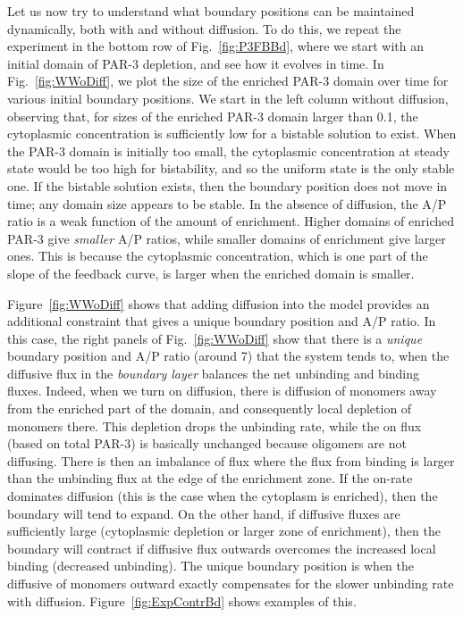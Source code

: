 \documentclass[11pt]{article}
\newcommand{\6}[1]{#1_{\text{6}}}
\newcommand{\3}[1]{#1_{\text{3}}}
\begin{document}
Let us now try to understand what boundary positions can be maintained dynamically, both with and without diffusion. To do this, we repeat the experiment in the bottom row of Fig.\ \ref{fig:P3FBBd}, where we start with an initial domain of PAR-3 depletion, and see how it evolves in time. In Fig.\ \ref{fig:WWoDiff}, we plot the size of the enriched PAR-3 domain over time for various initial boundary positions. We start in the left column without diffusion, observing that, for sizes of the enriched PAR-3 domain larger than 0.1, the cytoplasmic concentration is sufficiently low for a bistable solution to exist. When the PAR-3 domain is initially too small, the cytoplasmic concentration at steady state would be too high for bistability, and so the uniform state is the only stable one. If the bistable solution exists, then the boundary position does not move in time; any domain size appears to be stable. In the absence of diffusion, the A/P ratio is a weak function of the amount of enrichment. Higher domains of enriched PAR-3 give \emph{smaller} A/P ratios, while smaller domains of enrichment give larger ones. This is because the cytoplasmic concentration, which is one part of the slope of the feedback curve, is larger when the enriched domain is smaller. 

Figure\ \ref{fig:WWoDiff} shows that adding diffusion into the model provides an additional constraint that gives a unique boundary position and A/P ratio. In this case, the right panels of Fig.\ \ref{fig:WWoDiff} show that there is a \emph{unique} boundary position and A/P ratio (around 7) that the system tends to, when the diffusive flux in the \emph{boundary layer} balances the net unbinding and binding fluxes. Indeed, when we turn on diffusion, there is diffusion of monomers away from the enriched part of the domain, and consequently local depletion of monomers there. This depletion drops the unbinding rate, while the on flux (based on total PAR-3) is basically unchanged because oligomers are not diffusing. There is then an imbalance of flux where the flux from binding is larger than the unbinding flux at the edge of the enrichment zone. If the on-rate dominates diffusion (this is the case when the cytoplasm is enriched), then the boundary will tend to expand. On the other hand, if diffusive fluxes are sufficiently large (cytoplasmic depletion or larger zone of enrichment), then the boundary will contract if diffusive flux outwards overcomes the increased local binding (decreased unbinding). The unique boundary position is when the diffusive of monomers outward exactly compensates for the slower unbinding rate with diffusion. Figure\ \ref{fig:ExpContrBd} shows examples of this.
\end{document}
